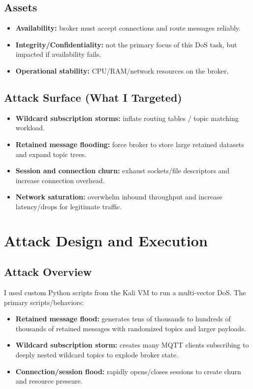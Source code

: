 \documentclass[11pt]{article}
\begin{document}
\subsection{Assets}
\begin{itemize}
  \item \textbf{Availability:} broker must accept connections and route messages reliably.
  \item \textbf{Integrity/Confidentiality:} not the primary focus of this DoS task, but impacted if availability fails.
  \item \textbf{Operational stability:} CPU/RAM/network resources on the broker.
\end{itemize}

\subsection{Attack Surface (What I Targeted)}
\begin{itemize}
  \item \textbf{Wildcard subscription storms:} inflate routing tables / topic matching workload.
  \item \textbf{Retained message flooding:} force broker to store large retained datasets and expand topic trees.
  \item \textbf{Session and connection churn:} exhaust sockets/file descriptors and increase connection overhead.
  \item \textbf{Network saturation:} overwhelm inbound throughput and increase latency/drops for legitimate traffic.
\end{itemize}

\section{Attack Design and Execution}
\subsection{Attack Overview}
I used custom Python scripts from the Kali VM to run a multi-vector DoS. The primary scripts/behaviors:
\begin{itemize}
  \item \textbf{Retained message flood:} generates tens of thousands to hundreds of thousands of retained messages with randomized topics and larger payloads.
  \item \textbf{Wildcard subscription storm:} creates many MQTT clients subscribing to deeply nested wildcard topics to explode broker state.
  \item \textbf{Connection/session flood:} rapidly opens/closes sessions to create churn and resource pressure.
\end{itemize}
\end{document}
